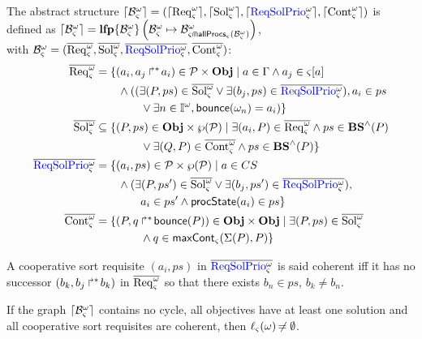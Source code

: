 \begin{definition}
  \label{def:aS}
  The abstract structure $\lceil \mathcal{B}_\varsigma^\omega\rceil=(\lceil \mathrm{Req}^\omega_\varsigma\rceil,\lceil \mathrm{Sol}^\omega_\varsigma\rceil,\lceil \textcolor{blue}{\mathrm{ReqSolPrio}}^\omega_\varsigma\rceil,\lceil \mathrm{Cont}^\omega_\varsigma\rceil)$ is defined as
  $\lceil \mathcal{B}_\varsigma^\omega\rceil = \mathbf{lfp}\{\mathcal{B}^\omega_\varsigma\}\left(\mathcal{B}^\omega_\varsigma\mapsto\mathcal{B}^\omega_{\varsigma \Cap \mathsf{allProcs}_\varsigma(\mathcal{B}^\omega_\varsigma)}\right)$,\\
  with $\mathcal{B}^\omega_\varsigma=(\overline{\mathrm{Req}^\omega_\varsigma},\overline{\mathrm{Sol}^\omega_\varsigma},\overline{\textcolor{blue}{\mathrm{ReqSolPrio}}^\omega_\varsigma},\overline{\mathrm{Cont}^\omega_\varsigma})$:
  \begin{align*}
    \myreq &= \{ (a_i,\PHobjp{a}{j}{i}) \in \PHproc \times \Obj \mid
      a \in \components \wedge a_j \in \PHget{\ctx}{a} \\ %
      & \qquad \wedge ((\exists (P,ps) \in \mysol \vee \exists (b_j, ps) \in \myrsp), a_i \in ps \\
      & \qquad\qquad \vee \exists n \in \indexes{\w}, \PHbounce(\w_n)=a_i) \}
    \\
    \mysol &\subseteq \{ (P,ps) \in \Obj \times \powerset(\PHproc) \mid
            \exists (a_i, P) \in \myreq \wedge ps \in \aBS(P) \\
      & \qquad\qquad \vee \exists (Q, P) \in \mycont \wedge ps \in \aBS(P) \}
    \\
    \myrsp &= \{ (a_i,ps) \in \PHproc \times \powerset(\PHproc) \mid a \in \cs \\
      & \qquad \wedge (\exists (P,ps') \in \mysol \vee \exists (b_j,ps') \in \myrsp), \\
      & \qquad\qquad a_i \in ps' \wedge \csState(a_i) \in ps \}
    \\
    \mycont & = \{ (P, \PHobj{q}{\PHbounce(P)}) \in \Obj \times \Obj \mid
      \exists (P, ps) \in \mysol \\
      & \qquad\qquad \wedge q \in \gCont_\ctx(\PHsort(P),P) \}
  \end{align*}
\end{definition}

\begin{definition}
\label{def:coherent}
  A cooperative sort requisite $(a_i, ps)$ in $\overline{\textcolor{blue}{\mathrm{ReqSolPrio}}^\omega_\varsigma}$ is said coherent iff
  it has no successor $(b_k,\mbox{${b}_{j}\Rsh^*\!{b}_{k}$})$ in $\overline{\mathrm{Req}^\omega_\varsigma}$ so that there exists $b_n \in ps$, $b_k \neq b_n$.
\end{definition}

\begin{theorem}
\label{th:approxinf}
  If the graph $\lceil \mathcal{B}_\varsigma^\omega\rceil$ contains no cycle,
  all objectives have at least one solution
  and all cooperative sort requisites are coherent,
  then $\ell_\varsigma(\omega) \not\nobreak\mkern -2mu = \emptyset$.
\end{theorem}

